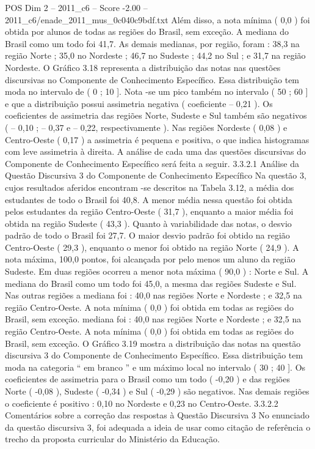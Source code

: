 \begin{textsample}{POS Dim 2 – 2011\_c6 – Score -2.00 – 2011\_c6/enade\_2011\_mus\_0c040c9bdf.txt}
Além disso, a nota mínima ( 0,0 ) foi obtida por alunos de todas as regiões do Brasil, sem exceção.
A mediana do Brasil como um todo foi 41,7.
As demais medianas, por região, foram : 38,3 na região Norte ; 35,0 no Nordeste ; 46,7 no Sudeste ; 44,2 no Sul ; e 31,7 na região Nordeste.
O Gráfico 3.18 representa a distribuição das notas nas questões discursivas no Componente de Conhecimento Específico.
Essa distribuição tem moda no intervalo de ( 0 ; 10 ].
Nota -se um pico também no intervalo ( 50 ; 60 ] e que a distribuição possui assimetria negativa ( coeficiente – 0,21 ).
Os coeficientes de assimetria das regiões Norte, Sudeste e Sul também são negativos ( – 0,10 ; – 0,37 e – 0,22, respectivamente ).
Nas regiões Nordeste ( 0,08 ) e Centro-Oeste ( 0,17 ) a assimetria é pequena e positiva, o que indica histogramas com leve assimetria à direita.
A análise de cada uma das questões discursivas do Componente de Conhecimento Específico será feita a seguir. 3.3.2.1 Análise da Questão Discursiva 3 do Componente de Conhecimento Específico Na questão 3, cujos resultados aferidos encontram -se descritos na Tabela 3.12, a média dos estudantes de todo o Brasil foi 40,8.
A menor média nessa questão foi obtida pelos estudantes da região Centro-Oeste ( 31,7 ), enquanto a maior média foi obtida na região Sudeste ( 43,3 ).
Quanto à variabilidade das notas, o desvio padrão de todo o Brasil foi 27,7.
O maior desvio padrão foi obtido na região Centro-Oeste ( 29,3 ), enquanto o menor foi obtido na região Norte ( 24,9 ).
A nota máxima, 100,0 pontos, foi alcançada por pelo menos um aluno da região Sudeste.
Em duas regiões ocorreu a menor nota máxima ( 90,0 ) : Norte e Sul.
A mediana do Brasil como um todo foi 45,0, a mesma das regiões Sudeste e Sul.
Nas outras regiões a mediana foi : 40,0 nas regiões Norte e Nordeste ; e 32,5 na região Centro-Oeste.
A nota mínima ( 0,0 ) foi obtida em todas as regiões do Brasil, sem exceção. mediana foi : 40,0 nas regiões Norte e Nordeste ; e 32,5 na região Centro-Oeste.
A nota mínima ( 0,0 ) foi obtida em todas as regiões do Brasil, sem exceção.
O Gráfico 3.19 mostra a distribuição das notas na questão discursiva 3 do Componente de Conhecimento Específico.
Essa distribuição tem moda na categoria “ em branco ” e um máximo local no intervalo ( 30 ; 40 ].
Os coeficientes de assimetria para o Brasil como um todo ( -0,20 ) e das regiões Norte ( -0,08 ), Sudeste ( -0,34 ) e Sul ( -0,29 ) são negativos.
Nas demais regiões o coeficiente é positivo : 0,10 no Nordeste e 0,23 no Centro-Oeste. 3.3.2.2 Comentários sobre a correção das respostas à Questão Discursiva 3 No enunciado da questão discursiva 3, foi adequada a ideia de usar como citação de referência o trecho da proposta curricular do Ministério da Educação.

\end{textsample}

